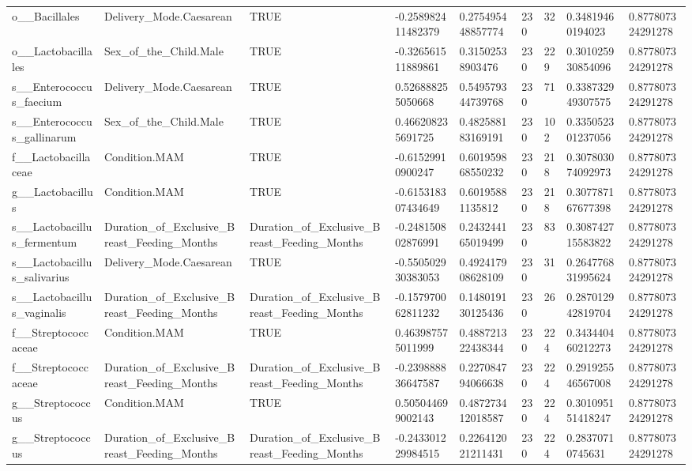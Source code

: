 \begin{longtable}{lllllllll}
o\_\_Bacillales & Delivery\_Mode.Caesarean & TRUE & -0.258982411482379 & 0.275495448857774 & 230 & 32 & 0.34819460194023 & 0.877807324291278 \\
o\_\_Lactobacillales & Sex\_of\_the\_Child.Male & TRUE & -0.326561511889861 & 0.31502538903476 & 230 & 229 & 0.301025930854096 & 0.877807324291278 \\
s\_\_Enterococcus\_faecium & Delivery\_Mode.Caesarean & TRUE & 0.526888255050668 & 0.549579344739768 & 230 & 71 & 0.338732949307575 & 0.877807324291278 \\
s\_\_Enterococcus\_gallinarum & Sex\_of\_the\_Child.Male & TRUE & 0.466208235691725 & 0.482588183169191 & 230 & 102 & 0.335052301237056 & 0.877807324291278 \\
f\_\_Lactobacillaceae & Condition.MAM & TRUE & -0.61529910900247 & 0.601959868550232 & 230 & 218 & 0.307803074092973 & 0.877807324291278 \\
g\_\_Lactobacillus & Condition.MAM & TRUE & -0.615318307434649 & 0.60195881135812 & 230 & 218 & 0.307787167677398 & 0.877807324291278 \\
s\_\_Lactobacillus\_fermentum & Duration\_of\_Exclusive\_Breast\_Feeding\_Months & Duration\_of\_Exclusive\_Breast\_Feeding\_Months & -0.248150802876991 & 0.243244165019499 & 230 & 83 & 0.308742715583822 & 0.877807324291278 \\
s\_\_Lactobacillus\_salivarius & Delivery\_Mode.Caesarean & TRUE & -0.550502930383053 & 0.492417908628109 & 230 & 31 & 0.264776831995624 & 0.877807324291278 \\
s\_\_Lactobacillus\_vaginalis & Duration\_of\_Exclusive\_Breast\_Feeding\_Months & Duration\_of\_Exclusive\_Breast\_Feeding\_Months & -0.157970062811232 & 0.148019130125436 & 230 & 26 & 0.287012942819704 & 0.877807324291278 \\
f\_\_Streptococcaceae & Condition.MAM & TRUE & 0.463987575011999 & 0.488721322438344 & 230 & 224 & 0.343440460212273 & 0.877807324291278 \\
f\_\_Streptococcaceae & Duration\_of\_Exclusive\_Breast\_Feeding\_Months & Duration\_of\_Exclusive\_Breast\_Feeding\_Months & -0.239888836647587 & 0.227084794066638 & 230 & 224 & 0.291925546567008 & 0.877807324291278 \\
g\_\_Streptococcus & Condition.MAM & TRUE & 0.505044699002143 & 0.487273412018587 & 230 & 224 & 0.301095151418247 & 0.877807324291278 \\
g\_\_Streptococcus & Duration\_of\_Exclusive\_Breast\_Feeding\_Months & Duration\_of\_Exclusive\_Breast\_Feeding\_Months & -0.243301229984515 & 0.226412021211431 & 230 & 224 & 0.28370710745631 & 0.877807324291278 \\

\end{longtable}
